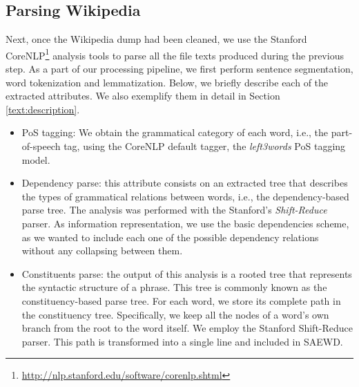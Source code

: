 \subsection{Parsing Wikipedia} Next, once the Wikipedia dump had been cleaned, we use the Stanford CoreNLP\footnote{\url{http://nlp.stanford.edu/software/corenlp.shtml}} \cite{manning2014} analysis tools to parse all the file texts produced during the previous step. As a part of our processing pipeline, we first perform  sentence segmentation, word tokenization and lemmatization. Below, we briefly describe each of the extracted attributes. We also exemplify them in detail in Section \ref{text:description}.
\begin{itemize}
\item PoS tagging: We obtain the grammatical category of each word, i.e., the part-of-speech tag, using the CoreNLP default tagger, the \textit{left3words} PoS tagging model.
\item Dependency parse: this attribute consists on an extracted tree that describes the types of grammatical relations between words, i.e., the dependency-based parse tree. 
The analysis was performed with the Stanford's \textit{Shift-Reduce}  parser.
As information representation, we use the basic dependencies scheme, as we wanted to include each one of the possible dependency relations without any collapsing between them.    
                                                                                                                                                                                    
                                                                                                                                                                                    
\item Constituents parse:                                                                                                                                                           
the output of this analysis is a rooted tree that represents the syntactic structure of a phrase.                                                                                  
This tree is commonly known as the constituency-based parse tree.                                                                                                                  
For each word, we store its complete path in the constituency tree.
 Specifically, we keep all the nodes of a word's own branch from the root to the word itself.
 We employ the Stanford Shift-Reduce parser.
 This path is transformed into a single line and included in SAEWD. 
 

\end{itemize} 	
